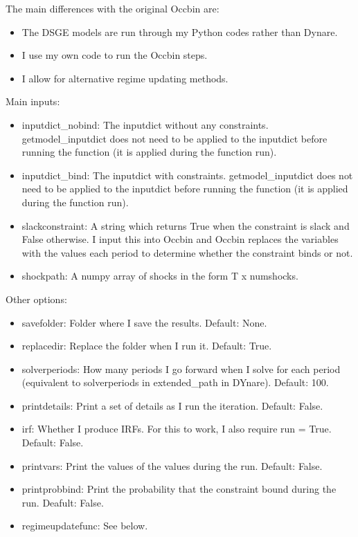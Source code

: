 \documentclass{article}
\theoremstyle{definition}
\begin{document}
The main differences with the original Occbin are:
\begin{itemize}
    \item The DSGE models are run through my Python codes rather than Dynare.
    \item I use my own code to run the Occbin steps.
    \item I allow for alternative regime updating methods.
\end{itemize}

Main inputs:
\begin{itemize}
    \item inputdict\_nobind: The inputdict without any constraints. getmodel\_inputdict does not need to be applied to the inputdict before running the function (it is applied during the function run).
    \item inputdict\_bind: The inputdict with constraints. getmodel\_inputdict does not need to be applied to the inputdict before running the function (it is applied during the function run).
    \item slackconstraint: A string which returns True when the constraint is slack and False otherwise. I input this into Occbin and Occbin replaces the variables with the values each period to determine whether the constraint binds or not.
    \item shockpath: A numpy array of shocks in the form T x numshocks.
\end{itemize}

Other options:
\begin{itemize}
    \item savefolder: Folder where I save the results. Default: None.
    \item replacedir: Replace the folder when I run it. Default: True.
    \item solverperiods: How many periods I go forward when I solve for each period (equivalent to solverperiods in extended\_path in DYnare). Default: 100.
    \item printdetails: Print a set of details as I run the iteration. Default: False.
    \item irf: Whether I produce IRFs. For this to work, I also require run = True. Default: False.
    \item printvars: Print the values of the values during the run. Default: False.
    \item printprobbind: Print the probability that the constraint bound during the run. Deafult: False.
    \item regimeupdatefunc: See below.
\end{itemize}
\end{document}

